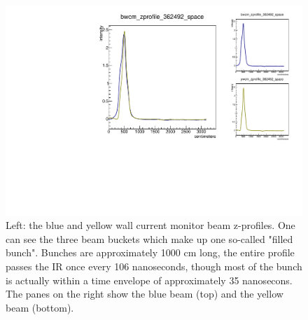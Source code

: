 \begin{figure}
\begin{center}
\includegraphics[width=\linewidth,height=\textheight,keepaspectratio]{./figures/362492_wcm_zprofile}
\caption{ 
Left: the blue and yellow wall current monitor beam z-profiles. One can see the
three beam buckets which make up one so-called "filled bunch". Bunches are
approximately 1000 cm long, the entire profile passes the IR once every 106
nanoseconds, though most of the bunch is actually within a time envelope of
approximately 35 nanosecons. The panes on the right show the blue beam (top)
and the yellow beam (bottom).
}
\label{fig:362492_wcm_zprofile}
\end{center}
\end{figure}
